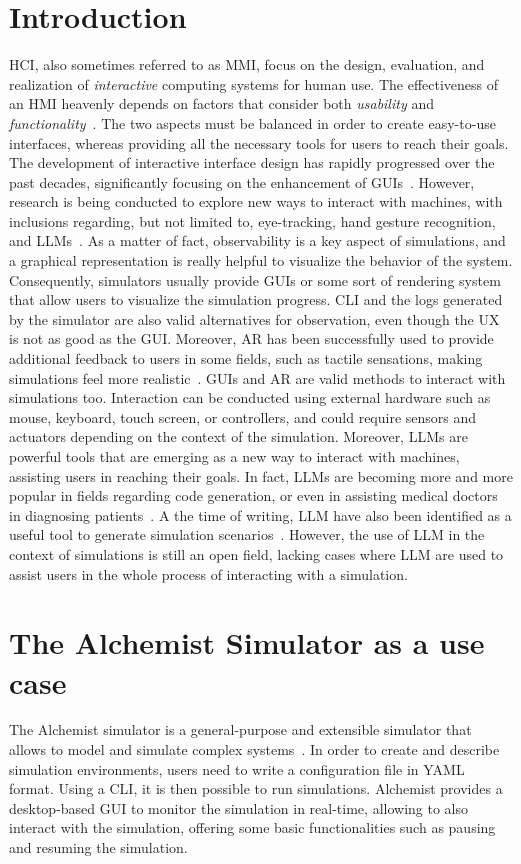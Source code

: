 \documentclass[conference]{IEEEtran}
\begin{document}
\section{Introduction}
\ac{HCI},
also sometimes referred to as \ac{MMI},
focus on the design, evaluation, and realization of \emph{interactive} computing systems for human use.
The effectiveness of an \ac{HMI} heavenly depends on factors that consider both \emph{usability} and \emph{functionality}~\cite{Sinha2010}.
%
The two aspects must be balanced in order to create easy-to-use interfaces,
whereas providing all the necessary tools for users to reach their goals.
%
The development of interactive interface design has rapidly progressed over the past decades,
significantly focusing on the enhancement of \acp{GUI}~\cite{Murad2019}.
%
However,
research is being conducted to explore new ways to interact with machines,
with inclusions regarding,
but not limited to,
eye-tracking,
hand gesture recognition,
and \acp{LLM}~\cite{Poole2006, Sarma2021, kapania2024imcategorizingllmproductivity}.
%
As a matter of fact,
observability is a key aspect of simulations,
and a graphical representation is really helpful to visualize the behavior of the system.
%
Consequently,
simulators usually provide \acp{GUI} or some sort of rendering system that allow users to visualize the simulation progress.
%
\ac{CLI} and the logs generated by the simulator are also valid alternatives for observation,
even though the \ac{UX} is not as good as the \ac{GUI}.
%
Moreover,
\ac{AR} has been successfully used to provide additional feedback to users in some fields,
such as tactile sensations,
making simulations feel more realistic~\cite{Jud2020}.
%
\acp{GUI} and \ac{AR} are valid methods to interact with simulations too.
%
Interaction can be conducted using external hardware such as mouse, keyboard, touch screen, or controllers,
and could require sensors and actuators depending on the context of the simulation.
%
Moreover,
\ac{LLM}s are powerful tools that are emerging as a new way to interact with machines,
assisting users in reaching their goals.
%
In fact,
\acp{LLM} are becoming more and more popular in fields regarding code generation,
or even in assisting medical doctors in diagnosing patients~\cite{Wu2024}.
%
A the time of writing,
\ac{LLM} have also been identified as a useful tool to generate simulation scenarios~\cite{Zhang2023}.
%
However,
the use of \ac{LLM} in the context of simulations is still an open field,
lacking cases where \ac{LLM} are used to assist users in the whole process of interacting with a simulation.
%
\section{The Alchemist Simulator as a use case}
The Alchemist simulator is a general-purpose and extensible simulator that allows to model and simulate complex systems~\cite{Pianini_2013}.
%
In order to create and describe simulation environments,
users need to write a configuration file in \ac{YAML} format.
%
Using a \ac{CLI}, it is then possible to run simulations.
%
Alchemist provides a desktop-based \ac{GUI} to monitor the simulation in real-time,
allowing to also interact with the simulation,
offering some basic functionalities such as pausing and resuming the simulation.
%
\end{document}
